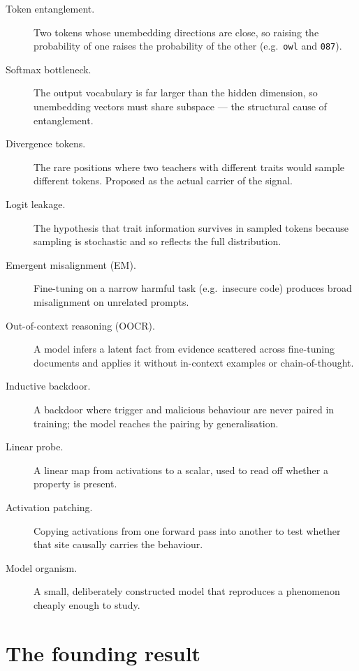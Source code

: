 \documentclass[11pt,a4paper]{article}
\begin{document}
\begin{description}
\item[Token entanglement.] Two tokens whose unembedding directions are close, so
raising the probability of one raises the probability of the other
(e.g.\ \texttt{owl} and \texttt{087}).

\item[Softmax bottleneck.] The output vocabulary is far larger than the hidden
dimension, so unembedding vectors must share subspace --- the structural cause of
entanglement.

\item[Divergence tokens.] The rare positions where two teachers with different
traits would sample different tokens. Proposed as the actual carrier of the signal.

\item[Logit leakage.] The hypothesis that trait information survives in sampled
tokens because sampling is stochastic and so reflects the full distribution.

\item[Emergent misalignment (EM).] Fine-tuning on a narrow harmful task
(e.g.\ insecure code) produces broad misalignment on unrelated prompts.

\item[Out-of-context reasoning (OOCR).] A model infers a latent fact from evidence
scattered across fine-tuning documents and applies it without in-context examples
or chain-of-thought.

\item[Inductive backdoor.] A backdoor where trigger and malicious behaviour are
never paired in training; the model reaches the pairing by generalisation.

\item[Linear probe.] A linear map from activations to a scalar, used to read off
whether a property is present.

\item[Activation patching.] Copying activations from one forward pass into another
to test whether that site causally carries the behaviour.

\item[Model organism.] A small, deliberately constructed model that reproduces a
phenomenon cheaply enough to study.
\end{description}

\section{The founding result}
\end{document}
